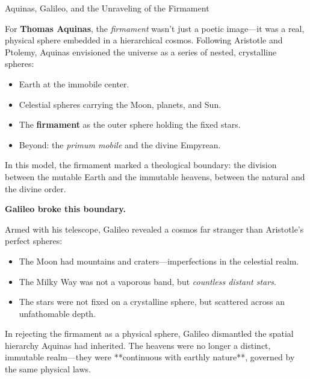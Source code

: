 \begin{HistoricalSidebar}{Aquinas, Galileo, and the Unraveling of the Firmament}

    For \textbf{Thomas Aquinas}, the \emph{firmament} wasn’t just a poetic image—it was a real, physical sphere embedded in a hierarchical cosmos. Following Aristotle and Ptolemy, Aquinas envisioned the universe as a series of nested, crystalline spheres:

    \medskip
    
    \begin{itemize}
      \item Earth at the immobile center.
      \item Celestial spheres carrying the Moon, planets, and Sun.
      \item The \textbf{firmament} as the outer sphere holding the fixed stars.
      \item Beyond: the \emph{primum mobile} and the divine Empyrean.
    \end{itemize}

    \medskip
    
    In this model, the firmament marked a theological boundary: the division between the mutable Earth and the immutable heavens, between the natural and the divine order.
    
    \medskip
    
    \textbf{Galileo broke this boundary.}

    \medskip
    
    Armed with his telescope, Galileo revealed a cosmos far stranger than Aristotle’s perfect spheres:

    \medskip
    
    \begin{itemize}
      \item The Moon had mountains and craters—imperfections in the celestial realm.
      \item The Milky Way was not a vaporous band, but \emph{countless distant stars}.
      \item The stars were not fixed on a crystalline sphere, but scattered across an unfathomable depth.
    \end{itemize}

    \medskip

    In rejecting the firmament as a physical sphere, Galileo dismantled the spatial hierarchy Aquinas had inherited. The heavens were no longer a distinct, immutable realm—they were **continuous with earthly nature**, governed by the same physical laws.
    

\end{HistoricalSidebar}
